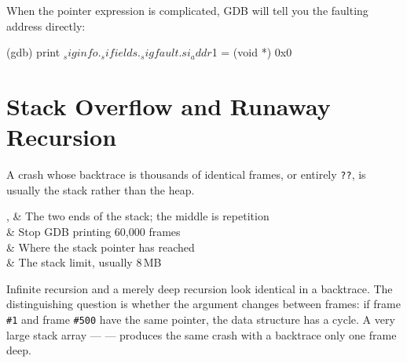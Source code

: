 \begin{note}
	When the pointer expression is complicated, GDB will tell you the faulting
	address directly:
\begin{gdbcode}
(gdb) print $_siginfo._sifields._sigfault.si_addr
$1 = (void *) 0x0
\end{gdbcode}
\end{note}

\section{Stack Overflow and Runaway Recursion}\label{sec:gdb-stackoverflow}

A crash whose backtrace is thousands of identical frames, or entirely
\texttt{??}, is usually the stack rather than the heap.


\begin{keys}[0.30]
	,    & The two ends of the stack; the middle is repetition \\
	 & Stop GDB printing 60,000 frames                    \\
	            & Where the stack pointer has reached                 \\
	             & The stack limit, usually 8\,MB                      \\
\end{keys}

\begin{note}
	Infinite recursion and a merely deep recursion look identical in a backtrace.
	The distinguishing question is whether the argument changes between frames: if
	frame \texttt{\#1} and frame \texttt{\#500} have the same pointer, the data
	structure has a cycle. A very large stack array --- 
	--- produces the same crash with a backtrace only one frame deep.
\end{note}

